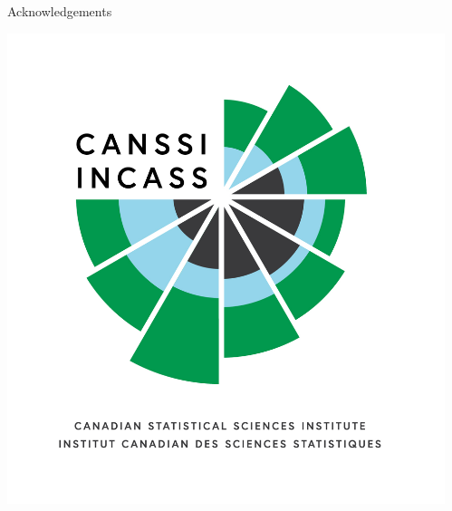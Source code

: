 \documentclass[final]{beamer}
\newlength{\sepwid}
\newlength{\onecolwid}
\begin{document}
\begin{frame}[t]
\begin{columns}[t]
\begin{column}{\onecolwid}
\begin{block}{Acknowledgements}
\begin{center}
					\includegraphics[width=7in]{CANSSI_Logo-tag-stacked.jpg}
				\end{center}
			\end{block}
		\end{column}
		\begin{column}{\sepwid}\end{column}			%
	\end{columns}
\end{frame}
\end{document}
